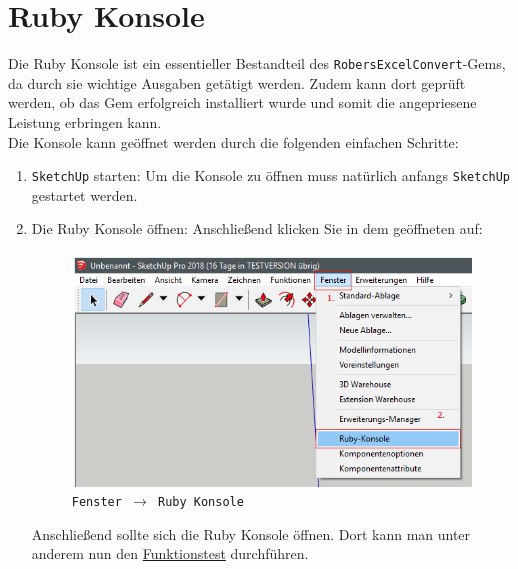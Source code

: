 \documentclass{book}
\newcommand{\sketchup}{\texttt{SketchUp}\xspace}
\newcommand{\robersexcelconvert}{\texttt{RobersExcelConvert}\xspace}
\begin{document}
		\section{Ruby Konsole} \label{Ruby Konsole}
			Die Ruby Konsole ist ein essentieller Bestandteil des \robersexcelconvert-Gems, da durch sie wichtige Ausgaben getätigt werden. Zudem kann dort geprüft werden, ob das Gem erfolgreich installiert wurde und somit die angepriesene Leistung erbringen kann.\\
			Die Konsole kann geöffnet werden durch die folgenden einfachen Schritte:
				\begin{enumerate}
					\item \sketchup starten:
						Um die Konsole zu öffnen muss natürlich anfangs \sketchup gestartet werden.
					\item Die Ruby Konsole öffnen:
						Anschließend klicken Sie in dem geöffneten auf:
						\begin{figure}[H]
							\centering
							\includegraphics[scale=0.6]{pics/Ruby-Konsole-oeffnen.png}\\
							\texttt{Fenster $\rightarrow$ Ruby Konsole}							
						\end{figure}
						Anschließend sollte sich die Ruby Konsole öffnen. Dort kann man unter anderem nun den \hyperref[Funktionstest]{Funktionstest} durchführen.
				\end{enumerate}
\end{document}
